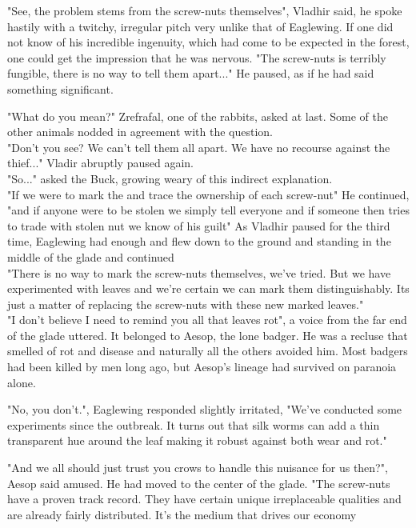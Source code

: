 \documentclass[smalldemyvopaper,11pt,twoside,onecolumn,openright,extrafontsizes]{memoir}
\begin{document}
"See, the problem stems from the screw-nuts themselves", Vladhir said, he spoke hastily with a twitchy, irregular pitch very unlike that of Eaglewing. If one did not know of his incredible ingenuity, which had come to be expected in the forest, one could get the impression that he was nervous. "The screw-nuts is terribly fungible, there is no way to tell them apart..." He paused, as if he had said something significant.  

"What do you mean?" Zrefrafal, one of the rabbits, asked at last. Some of the other animals nodded in agreement with the question.\\

"Don't you see? We can't tell them all apart. We have no recourse against the thief..." Vladir abruptly paused again.\\

"So..." asked the Buck, growing weary of this indirect explanation.\\

"If we were to mark the and trace the ownership of each screw-nut" He continued, "and if anyone were to be stolen we simply tell everyone and if someone then tries to trade with stolen nut we know of his guilt" As Vladhir paused for the third time, Eaglewing had enough and flew down to the ground and standing in the middle of the glade and continued \\

"There is no way to mark the screw-nuts themselves, we've tried. But we have experimented with leaves and we're certain we can mark them distinguishably. Its just a matter of replacing the screw-nuts with these new marked leaves."\\

"I don't believe I need to remind you all that leaves rot", a voice from the far end of the glade uttered. It belonged to Aesop, the lone badger. He was a recluse that smelled of rot and disease and naturally all the others avoided him. Most badgers had been killed by men long ago, but Aesop's lineage had survived on paranoia alone. 

"No, you don't.", Eaglewing responded slightly irritated, "We've conducted some experiments since the outbreak. It turns out that silk worms can add a thin transparent hue around the leaf making it robust against both wear and rot."

"And we all should just trust you crows to handle this nuisance for us then?", Aesop said amused. He had moved to the center of the glade. "The screw-nuts have a proven track record. They have certain unique irreplaceable qualities and are already fairly distributed. It's the medium that drives our economy%
\end{document}
